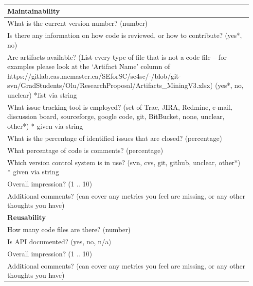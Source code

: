 \documentclass[12pt, notitlepage]{article}
\begin{document}
\begin{appendices}
\begin{singlespace}
\def\arraystretch{1.4}
\begin{tabular}{p{14cm}}
		\hline	
	\textbf{Maintainability}\\
	\hline
	What is the current version number? (number)\\
	Is there any information on how code is reviewed, or how to contribute? ({yes*, no})\\
	Are artifacts available? (List every type of file that is not a code file – for examples please look at the ‘Artifact Name’ column of https://gitlab.cas.mcmaster.ca/SEforSC/se4sc/-/blob/git-svn/GradStudents/Olu/ResearchProposal/Artifacts\_MiningV3.xlsx) ({yes*, no, unclear}) *list via string\\
	What issue tracking tool is employed? (set of {Trac, JIRA, Redmine, e-mail, discussion board, sourceforge, google code, git, BitBucket, none, unclear, other*}) * given via string\\
	What is the percentage of identified issues that are closed? (percentage)\\
	What percentage of code is comments? (percentage)\\
	Which version control system is in use? ({svn, cvs, git, github, unclear, other*}) * given via string\\
	Overall impression? ({1 .. 10})\\
	Additional comments? (can cover any metrics you feel are missing, or any other thoughts you have)\\
	\hline		
	\textbf{Reusability}\\
	\hline
	How many code files are there? (number)\\
	Is API documented? ({yes, no, n/a})\\
	Overall impression? ({1 .. 10})\\
	Additional comments? (can cover any metrics you feel are missing, or any other thoughts you have)\\
	\hline		
\end{tabular}


\end{singlespace}
\end{appendices}
\end{document}
